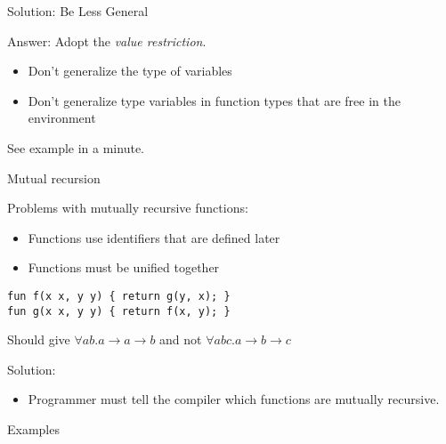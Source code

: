 \documentclass{beamer}
\newcommand{\arr}{\rightarrow}
\begin{document}
\begin{frame}{Solution: Be Less General}

Answer: Adopt the \emph{value restriction}.

\begin{itemize}
  \item Don't generalize the type of variables
  \item Don't generalize type variables in function types that are free
  in the environment
\end{itemize}

See example in a minute.

\end{frame}


\begin{frame}[fragile]{Mutual recursion}

\onslide<+->

Problems with mutually recursive functions:

\begin{itemize}
  \item Functions use identifiers that are defined later
  \item Functions must be unified together
\end{itemize}

\begin{verbatim}
fun f(x x, y y) { return g(y, x); }
fun g(x x, y y) { return f(x, y); }
\end{verbatim}

Should give $\forall ab . a \arr a \arr b$ and not $\forall abc . a
\arr b \arr c$

\onslide<+->

\vspace{1em}

Solution:

\begin{itemize}
  \item Programmer must tell the compiler which functions are mutually
  recursive.
\end{itemize}

\end{frame}


\begin{frame}{Examples}
\end{frame}
\end{document}
